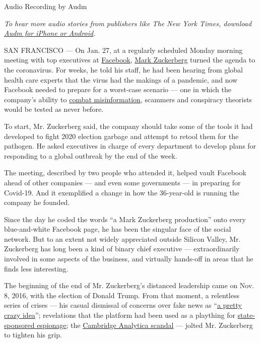 Audio Recording by Audm

\emph{To hear more audio stories from publishers like The New York
Times, download}
\href{https://www.audm.com/?utm_source=nyt\&utm_medium=embed\&utm_campaign=facebook_zuckerberg_production}{\emph{Audm
for iPhone or Android}}\emph{.}

SAN FRANCISCO --- On Jan. 27, at a regularly scheduled Monday morning
meeting with top executives at
\href{https://www.nytimes3xbfgragh.onion/2020/05/21/technology/facebook-remote-work-coronavirus.html}{Facebook},
\href{https://www.nytimes3xbfgragh.onion/2020/06/02/technology/zuckerberg-defends-facebook-trump-posts.html}{Mark
Zuckerberg} turned the agenda to the coronavirus. For weeks, he told his
staff, he had been hearing from global health care experts that the
virus had the makings of a pandemic, and now Facebook needed to prepare
for a worst-case scenario --- one in which the company's ability to
\href{https://www.nytimes3xbfgragh.onion/2020/03/08/technology/coronavirus-misinformation-social-media.html}{combat
misinformation}, scammers and conspiracy theorists would be tested as
never before.

To start, Mr. Zuckerberg said, the company should take some of the tools
it had developed to fight 2020 election garbage and attempt to retool
them for the pathogen. He asked executives in charge of every department
to develop plans for responding to a global outbreak by the end of the
week.

The meeting, described by two people who attended it, helped vault
Facebook ahead of other companies --- and even some governments --- in
preparing for Covid-19. And it exemplified a change in how the
36-year-old is running the company he founded.

Since the day he coded the words ``a Mark Zuckerberg production'' onto
every blue-and-white Facebook page, he has been the singular face of the
social network. But to an extent not widely appreciated outside Silicon
Valley, Mr. Zuckerberg has long been a kind of binary chief executive
--- extraordinarily involved in some aspects of the business, and
virtually hands-off in areas that he finds less interesting.

The beginning of the end of Mr. Zuckerberg's distanced leadership came
on Nov. 8, 2016, with the election of Donald Trump. From that moment, a
relentless series of crises --- his casual dismissal of concerns over
fake news as
``\href{https://www.theguardian.com/technology/2016/nov/10/facebook-fake-news-us-election-mark-zuckerberg-donald-trump}{a
pretty crazy idea}''; revelations that the platform had been used as a
plaything for
\href{https://www.nytimes3xbfgragh.onion/2017/09/07/us/politics/russia-facebook-twitter-election.html}{state-sponsored
espionage}; the
\href{https://www.nytimes3xbfgragh.onion/2018/04/04/us/politics/cambridge-analytica-scandal-fallout.html}{Cambridge
Analytica scandal} --- jolted Mr. Zuckerberg to tighten his grip.

